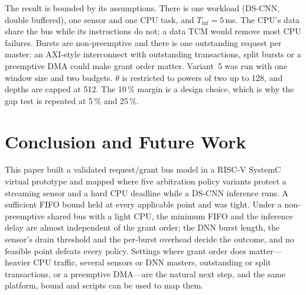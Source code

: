 \documentclass[conference]{IEEEtran}
\begin{document}
The result is bounded by its assumptions. There is one workload (DS-CNN, double buffered), one sensor and one CPU task, and $T_{\mathrm{inf}}=5$\,ms. The CPU's data share the bus while its instructions do not; a data TCM would remove most CPU failures. Bursts are non-preemptive and there is one outstanding request per master: an AXI-style interconnect with outstanding transactions, split bursts or a preemptive DMA could make grant order matter. Variant~5 was run with one window size and two budgets. $\theta$ is restricted to powers of two up to 128, and depths are capped at 512. The 10\,\% margin is a design choice, which is why the gap test is repeated at 5\,\% and 25\,\%.

\section{Conclusion and Future Work}\label{sec:conclusion}
This paper built a validated request/grant bus model in a RISC-V SystemC virtual prototype and mapped where five arbitration policy variants protect a streaming sensor and a hard CPU deadline while a DS-CNN inference runs. A sufficient FIFO bound held at every applicable point and was tight. Under a non-preemptive shared bus with a light CPU, the minimum FIFO and the inference delay are almost independent of the grant order; the DNN burst length, the sensor's drain threshold and the per-burst overhead decide the outcome, and no feasible point defeats every policy. Settings where grant order does matter---heavier CPU traffic, several sensors or DNN masters, outstanding or split transactions, or a preemptive DMA---are the natural next step, and the same platform, bound and scripts can be used to map them.



\end{document}
